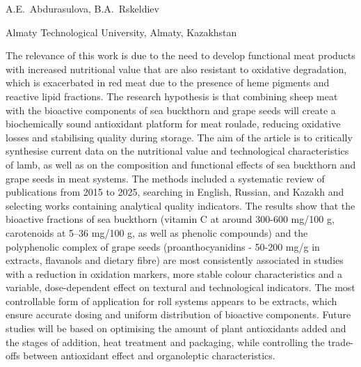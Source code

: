 
\begin{header}

A.E.~Abdurasulova\envelope,
B.A.~Rskeldiev
\end{header}

\begin{affil}
Almaty Technological University, Almaty, Kazakhstan

\end{affil}

The relevance of this work is due to the need to develop functional meat
products with increased nutritional value that are also resistant to
oxidative degradation, which is exacerbated in red meat due to the
presence of heme pigments and reactive lipid fractions. The research
hypothesis is that combining sheep meat with the bioactive components of
sea buckthorn and grape seeds will create a biochemically sound
antioxidant platform for meat roulade, reducing oxidative losses and
stabilising quality during storage. The aim of the article is to
critically synthesise current data on the nutritional value and
technological characteristics of lamb, as well as on the composition and
functional effects of sea buckthorn and grape seeds in meat systems. The
methods included a systematic review of publications from 2015 to 2025,
searching in English, Russian, and Kazakh and selecting works containing
analytical quality indicators. The results show that the bioactive
fractions of sea buckthorn (vitamin C at around 300-600 mg/100 g,
carotenoids at 5--36 mg/100 g, as well as phenolic compounds) and the
polyphenolic complex of grape seeds (proanthocyanidins - 50-200 mg/g in
extracts, flavanols and dietary fibre) are most consistently associated
in studies with a reduction in oxidation markers, more stable colour
characteristics and a variable, dose-dependent effect on textural and
technological indicators. The most controllable form of application for
roll systems appears to be extracts, which ensure accurate dosing and
uniform distribution of bioactive components. Future studies will be
based on optimising the amount of plant antioxidants added and the
stages of addition, heat treatment and packaging, while controlling the
trade-offs between antioxidant effect and organoleptic characteristics.

